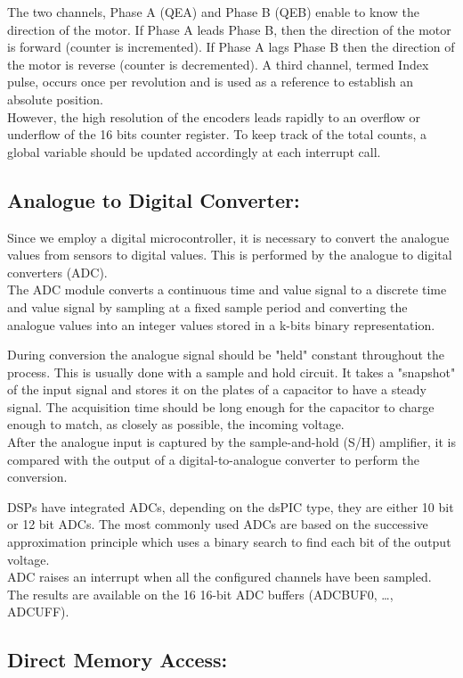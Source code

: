 The two channels, Phase A (QEA) and Phase B (QEB) enable to know the direction of the motor. If Phase A leads Phase B, then the direction of the motor is forward (counter is incremented). If Phase A lags Phase B then the direction of the motor is reverse (counter is decremented). A third channel, termed Index pulse, occurs once per revolution and is used as a reference to establish an absolute position.\\
However, the high resolution of the encoders leads rapidly to an overflow or underflow of the 16 bits counter register. To keep track of the total counts, a global variable should be updated accordingly at each interrupt call.

\subsection{Analogue to Digital Converter:}

Since we employ a digital microcontroller, it is necessary to convert the analogue values from sensors to digital values. This is performed by the analogue to digital converters (ADC).\\
The ADC module converts a continuous time and value signal to a discrete time and value signal by sampling at a fixed sample period and converting the analogue values into an integer values stored in a k-bits binary representation.

During conversion the analogue signal should be "held" constant throughout the process. This is usually done with a sample and hold circuit. It takes a "snapshot" of the input signal and stores it on the plates of a capacitor to have a steady signal. The acquisition time should be long enough for the capacitor to charge enough to match, as closely as possible, the incoming voltage.\\
After the analogue input is captured by the sample-and-hold (S/H) amplifier, it is compared with the output of a digital-to-analogue converter to perform the conversion. 

DSPs have integrated ADCs, depending on the dsPIC type, they are either 10 bit or 12 bit ADCs.  The most commonly used ADCs are based on the successive approximation principle which uses a binary search to find each bit of the output voltage.\\
ADC raises an interrupt when all the configured channels have been sampled. The results are available on the 16 16-bit ADC buffers (ADCBUF0, …, ADCUFF).


\subsection{Direct Memory Access:}

